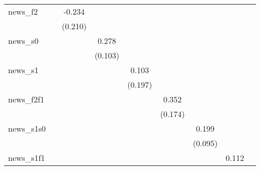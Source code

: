 {\begin{tabular}{l*{8}{c}}
news\_f2     &                     &      -0.234         &                     &                     &                     &                     &                     &                     \\
            &                     &     (0.210)         &                     &                     &                     &                     &                     &                     \\
\addlinespace
news\_s0     &                     &                     &       0.278\sym{**} &                     &                     &                     &                     &                     \\
            &                     &                     &     (0.103)         &                     &                     &                     &                     &                     \\
\addlinespace
news\_s1     &                     &                     &                     &       0.103         &                     &                     &                     &                     \\
            &                     &                     &                     &     (0.197)         &                     &                     &                     &                     \\
\addlinespace
news\_f2f1   &                     &                     &                     &                     &       0.352\sym{*}  &                     &                     &                     \\
            &                     &                     &                     &                     &     (0.174)         &                     &                     &                     \\
\addlinespace
news\_s1s0   &                     &                     &                     &                     &                     &       0.199\sym{**} &                     &                     \\
            &                     &                     &                     &                     &                     &     (0.095)         &                     &                     \\
\addlinespace
news\_s1f1   &                     &                     &                     &                     &                     &                     &       0.112         &                     \\

\end{tabular}}
